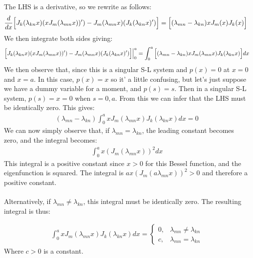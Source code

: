 \documentclass{article}
\begin{document}
The LHS is a derivative, so we rewrite as follows:
\begin{equation}
\begin{aligned}
\frac{d}{dx} \Big{[}J_k(\lambda_{kn}x)(xJ_m(\lambda_{mn}x))') - J_m(\lambda_{mn}x)(J_k(\lambda_{kn}x)') \Big{]} = \Big{[}(\lambda_{mn} - \lambda_{kn})xJ_m(x)J_k(x)\Big{]}\
\end{aligned}
\end{equation}
We then integrate both sides giving:
\begin{equation}
\begin{aligned}
 \Big{[}J_k(\lambda_{kn}x)(xJ_m(\lambda_{mn}x))') - J_m(\lambda_{mn}x)(J_k(\lambda_{kn}x)') \Big{]}\Big{|}_0^a = \int_0^a\Big{[}(\lambda_{mn} - \lambda_{kn})xJ_m(\lambda_{mn}x)J_k(\lambda_{kn}x)\Big{]}dx
\end{aligned}
\end{equation}
We then observe that, since this is a singular S-L system and $p(x) = 0$ at $x=0$ and $x=a$. In this case, $p(x) = x$ so it' a little confusing, but let's just suppose we have a dummy variable for a moment, and $p(s) = s$. Then in a singular S-L system, $p(s) = x = 0$ when $s = 0, a$. From this we can infer that the LHS must be identically zero. This gives:
\begin{equation}
 \begin{aligned}
(\lambda_{mn} - \lambda_{kn})\int_0^axJ_m(\lambda_{mn}x)J_k(\lambda_{kn}x)dx = 0
\end{aligned}
\end{equation}
We can now simply observe that, if $\lambda_{mn} = \lambda_{kn}$, the leading constant becomes zero, and the integral becomes:
\begin{equation}
\begin{aligned}
\int_0^ax(J_m(\lambda_{mn}x))^2dx
\end{aligned}
\end{equation}
This integral is a positive constant since $x>0$ for this Bessel function, and the eigenfunction is squared. The integral is $ax(J_m(a\lambda_{mn}x))^2 >0$ and therefore a positive constant. \\
\\
Alternatively, if $\lambda_{mn} \neq \lambda_{kn}$, this integral must be identically zero. The resulting integral is thus:
\begin{tcolorbox}[minipage,colback=white,arc=0pt,outer arc=0pt]
\begin{equation}
\begin{aligned}
\int_0^axJ_m(\lambda_{mn}x)J_k(\lambda_{kn}x)dx =
 \begin{cases} 
      0, & \lambda_{mn} \neq \lambda_{kn} \\
      c, & \lambda_{mn} = \lambda_{kn}
   \end{cases}
\end{aligned}
\end{equation}
Where $c>0$ is a constant.
\end{tcolorbox}
\end{document}
